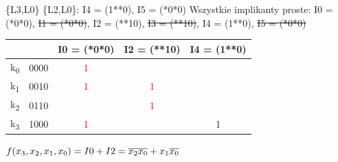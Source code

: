 \documentclass[]{article}
\begin{document}
\newline
\{L3,L0\} \{L2,L0\}: I4 = (1**0), I5 = (*0*0)
\newline
\newline
Wszystkie implikanty proste:
\newline
\newline
I0 = (*0*0), \sout{I1 = (*0*0)}, I2 = (**10), \sout{I3 = (**10)}, I4 = (1**0), \sout{I5 = (*0*0)}
\newline
\newline
\begin{tabular}[r]{|c|c|c|c|c|}
\hline
       &      & I0 = (*0*0) & I2 = (**10) & I4 = (1**0)\\
\hline
    k\textsubscript{0} & 0000 & \textcolor{red}{1} &   & \\
    k\textsubscript{1} & 0010 & \textcolor{red}{1} & \textcolor{red}{1} & \\
    k\textsubscript{2} & 0110 &   & \textcolor{red}{1} & \\
    k\textsubscript{3} & 1000 & \textcolor{red}{1} &   & 1 \\
 \hline 
\end{tabular}
\newline
\newline
$f(x\textsubscript{3},x\textsubscript{2},x\textsubscript{1},x\textsubscript{0}) = I0 + I2 = \overline{x_{2}}\overline{x_{0}} + x\textsubscript{1}\overline{x_{0}}$
\newpage
\end{document}
